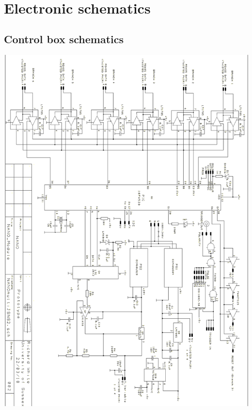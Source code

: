 
%
%
\section{Electronic schematics}
\label{app:schematics}
\subsection*{Control box schematics}
\includegraphics[width=0.9\linewidth]{figures/controlbox_schematic.png}
\newpage
